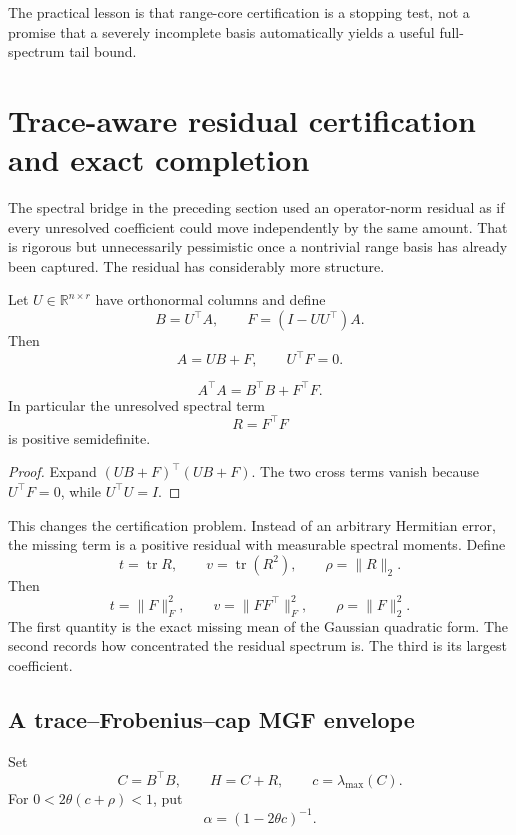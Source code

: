 The practical lesson is that range-core certification is a stopping test, not
a promise that a severely incomplete basis automatically yields a useful
full-spectrum tail bound.



\section{Trace-aware residual certification and exact completion}\label{sec:final-23}

The spectral bridge in the preceding section used an operator-norm residual as
if every unresolved coefficient could move independently by the same amount.
That is rigorous but unnecessarily pessimistic once a nontrivial range basis
has already been captured.  The residual has considerably more structure.

Let \(U\in\mathbb R^{n\times r}\) have orthonormal columns and define
\[
B=U^\top A,
\qquad
F=(I-UU^\top)A.
\]
Then
\[
A=UB+F,
\qquad
U^\top F=0.
\]

\begin{theorem}\label{claim:final-23-1}
\[
\boxed{
A^\top A
=
B^\top B+F^\top F.
}
\]
In particular the unresolved spectral term
\[
R=F^\top F
\]
is positive semidefinite.
\end{theorem}

\begin{proof}
Expand \((UB+F)^\top(UB+F)\).  The two cross terms vanish because
\(U^\top F=0\), while \(U^\top U=I\).
\end{proof}

This changes the certification problem.  Instead of an arbitrary Hermitian
error, the missing term is a positive residual with measurable spectral
moments.  Define
\[
t=\operatorname{tr}R,
\qquad
v=\operatorname{tr}(R^2),
\qquad
\rho=\|R\|_2.
\]
Then
\[
\boxed{
 t=\|F\|_F^2,
 \qquad
 v=\|FF^\top\|_F^2,
 \qquad
 \rho=\|F\|_2^2.
}
\]
The first quantity is the exact missing mean of the Gaussian quadratic form.
The second records how concentrated the residual spectrum is. The third is
its largest coefficient.

\subsection{A trace--Frobenius--cap MGF envelope}

Set
\[
C=B^\top B,
\qquad
H=C+R,
\qquad
c=\lambda_{\max}(C).
\]
For \(0<2\theta(c+\rho)<1\), put
\[
\alpha=(1-2\theta c)^{-1}.
\]

